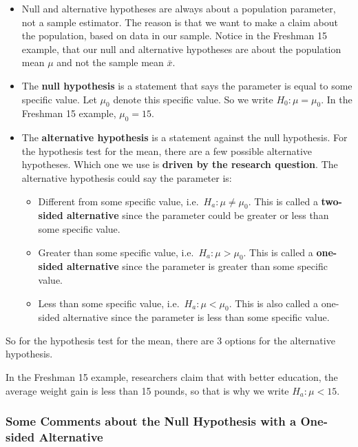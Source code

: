 \documentclass[
]{book}
\begin{document}
\begin{itemize}
\item
  Null and alternative hypotheses are always about a population parameter, not a sample estimator. The reason is that we want to make a claim about the population, based on data in our sample. Notice in the Freshman 15 example, that our null and alternative hypotheses are about the population mean \(\mu\) and not the sample mean \(\bar{x}\).
\item
  The \textbf{null hypothesis} is a statement that says the parameter is equal to some specific value. Let \(\mu_0\) denote this specific value. So we write \(H_0: \mu = \mu_0\). In the Freshman 15 example, \(\mu_0 = 15\).
\item
  The \textbf{alternative hypothesis} is a statement against the null hypothesis. For the hypothesis test for the mean, there are a few possible alternative hypotheses. Which one we use is \textbf{driven by the research question}. The alternative hypothesis could say the parameter is:

  \begin{itemize}
  \item
    Different from some specific value, i.e.~\(H_a: \mu \neq \mu_0\). This is called a \textbf{two-sided alternative} since the parameter could be greater or less than some specific value.
  \item
    Greater than some specific value, i.e.~\(H_a: \mu > \mu_0\). This is called a \textbf{one-sided alternative} since the parameter is greater than some specific value.
  \item
    Less than some specific value, i.e.~\(H_a: \mu < \mu_0\). This is also called a one-sided alternative since the parameter is less than some specific value.
  \end{itemize}
\end{itemize}

So for the hypothesis test for the mean, there are 3 options for the alternative hypothesis.

In the Freshman 15 example, researchers claim that with better education, the average weight gain is less than 15 pounds, so that is why we write \(H_a: \mu < 15\).

\hypertarget{some-comments-about-the-null-hypothesis-with-a-one-sided-alternative}{%
\subsubsection{Some Comments about the Null Hypothesis with a One-sided Alternative}\label{some-comments-about-the-null-hypothesis-with-a-one-sided-alternative}}
\end{document}
